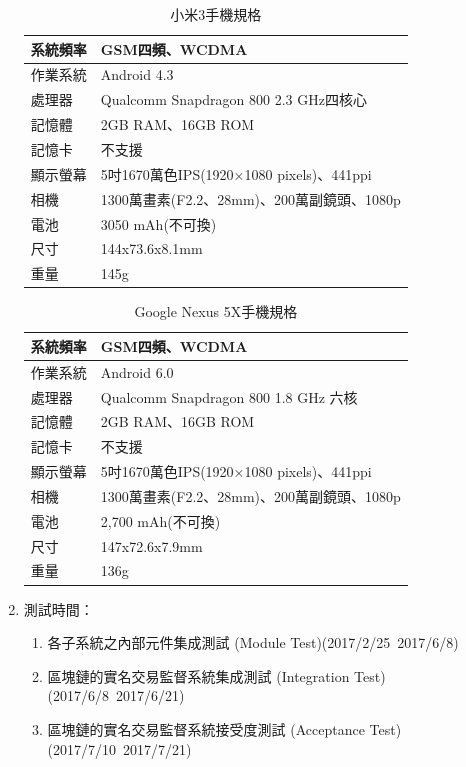 \begin{enumerate}
	 				\begin{table}[htbp]
					\centering
					\caption{小米3手機規格}
					\label{mi}
					\begin{tabular}{|l|l|}
					\hline
					系統頻率 & GSM四頻、WCDMA \\ \hline
					作業系統 & Android 4.3 \\ \hline
					處理器 & Qualcomm Snapdragon 800 2.3 GHz四核心 \\ \hline
					記憶體 & 2GB RAM、16GB ROM \\ \hline
					記憶卡 & 不支援 \\ \hline
					顯示螢幕 & 5吋1670萬色IPS(1920×1080 pixels)、441ppi \\ \hline
					相機 & 1300萬畫素(F2.2、28mm)、200萬副鏡頭、1080p \\ \hline
					電池 & 3050 mAh(不可換) \\ \hline
					尺寸 & 144x73.6x8.1mm \\ \hline
					重量 & 145g \\ \hline
					\end{tabular}
					\end{table}

					\begin{table}[htbp]
					\centering
					\caption{Google Nexus 5X手機規格}
					\label{5x}
					\begin{tabular}{|l|l|}
					\hline
					系統頻率 & GSM四頻、WCDMA \\ \hline
					作業系統 & Android 6.0 \\ \hline
					處理器 & Qualcomm Snapdragon 800 1.8 GHz 六核 \\ \hline
					記憶體 & 2GB RAM、16GB ROM \\ \hline
					記憶卡 & 不支援 \\ \hline
					顯示螢幕 & 5吋1670萬色IPS(1920×1080 pixels)、441ppi \\ \hline
					相機 & 1300萬畫素(F2.2、28mm)、200萬副鏡頭、1080p \\ \hline
					電池 & 2,700 mAh(不可換) \\ \hline
					尺寸 & 147x72.6x7.9mm \\ \hline
					重量 & 136g \\ \hline
					\end{tabular}
					\end{table}

	 		\item 測試時間：

	 			\begin{enumerate}
	 				\item 各子系統之內部元件集成測試 (Module Test)(2017/2/25~2017/6/8)
	 				\item 區塊鏈的實名交易監督系統集成測試 (Integration Test) (2017/6/8~2017/6/21)
	 				\item 區塊鏈的實名交易監督系統接受度測試 (Acceptance Test) (2017/7/10~2017/7/21)
				\end{enumerate}


\end{enumerate}
